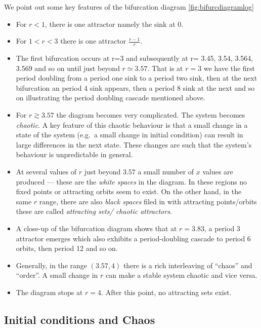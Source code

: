 \documentclass[
  a4paper,
  oneside,
  final]{krantz}
\providecommand{\tightlist}{%
  \setlength{\itemsep}{0pt}\setlength{\parskip}{0pt}}
\theoremstyle{definition}
\theoremstyle{definition}
\theoremstyle{definition}
\theoremstyle{definition}
\theoremstyle{remark}
\begin{document}
We point out some key features of the bifurcation diagram \ref{fig:bifurcdiagramlog}

\begin{itemize}
\tightlist
\item
  For \(r < 1\), there is one attractor namely the sink at 0.
\item
  For \(1< r <3\) there is one attractor \(\frac{r - 1}{r}\).
\item
  The first bifurcation occurs at r=3 and subsequently at r= 3.45, 3.54, 3.564, 3.569 and so on until just beyond \(r \simeq 3.57\). That is at \(r=3\) we have the first period doubling from a period one sink to a period two sink, then at the next bifurcation an period 4 sink appears, then a period 8 sink at the next and so on illustrating the period doubling cascade mentioned above.
\item
  For \(r \gtrsim 3.57\) the diagram becomes very complicated. The system becomes \emph{chaotic}. A key feature of this chaotic behaviour is that a small change in a state of the system (e.g.~a small change in initial condition) can result in large differences in the next state. These changes are such that the system's behaviour is unpredictable in general.
\item
  At several values of \(r\) just beyond \(3.57\) a small number of \(x\) values are produced --- these are the \emph{white spaces} in the diagram. In these regions no fixed points or attracting orbits seem to exist. On the other hand, in the same \(r\) range, there are also \emph{black spaces} filed in with attracting points/orbits these are called \emph{attracting sets/ chaotic attractors}.
\item
  A close-up of the bifurcation diagram shows that at \(r=3.83\), a period 3 attractor emerges which also exhibits a period-doubling cascade to period 6 orbits, then period 12 and so on.
\item
  Generally, in the range \((3.57, 4)\) there is a rich interleaving of ``chaos'' and ``order''. A small change in \(r\) can make a stable system chaotic and vice versa.
\item
  The diagram stops at \(r=4\). After this point, no attracting sets exist.
\end{itemize}

\hypertarget{initial-conditions-chaos}{%
\subsection{Initial conditions and Chaos}\label{initial-conditions-chaos}}
\end{document}
